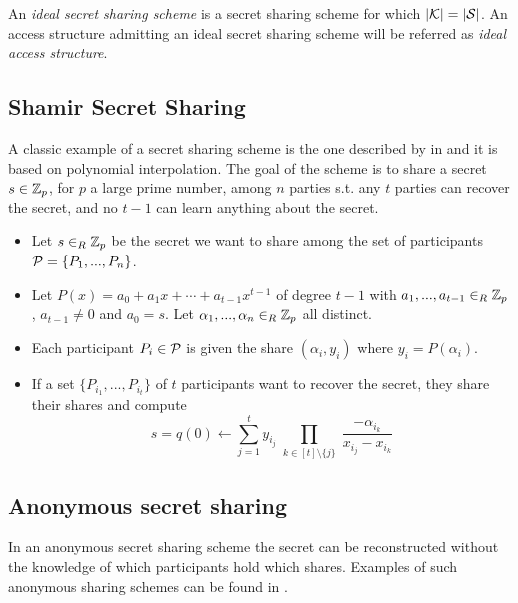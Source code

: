  An \textit{ideal secret sharing scheme} is a secret sharing scheme for which $\vert \mathcal{K} \vert = \vert \mathcal{S} \vert$. An access structure admitting an ideal secret sharing scheme will be referred as \textit{ideal access structure}.


\subsection{Shamir Secret Sharing}
A classic example of a secret sharing scheme is the one described by \citeauthor{Sham79} in \cite{Sham79} and it is based on polynomial interpolation. The goal of the scheme is to share a secret $s \in {\mathbb Z}_p$, for $p$ a large prime number, among $n$ parties s.t. any $t$ parties can recover the secret, and no $t-1$ can learn anything about the secret.

\begin{itemize}[align = left, leftmargin=*, label={--}]
\item Let $s \in_R {\mathbb Z}_p$ be the secret we want to share among the set of participants ${\mathcal P} = \{P_1, ... , P_n \}$.
\item Let $P(x) = a_0 + a_1 x + \cdots + a_{t-1} x^{t-1}$ of degree $t-1$ with $a_1, ..., a_{t-1} \in_R {\mathbb Z}_p$, $a_{t-1} \neq 0$ and $a_0 = s$. Let $\alpha_1, ... , \alpha_n \in_R {\mathbb Z}_p$ all distinct.
\item Each participant $P_i \in {\mathcal P}$ is given the share $(\alpha_i, y_i)$ where $y_i = P(\alpha_i)$.
\item If a set $\{P_{i_1},...,P_{i_t}\}$ of $t$ participants want to recover the secret, they share their shares and compute
$$ s = q(0) \leftarrow \sum_{j=1}^t y_{i_j} \prod_{\substack{k \in [t] \setminus \{j\}}} \frac{-\alpha_{i_k}}{x_{i_j}-x_{i_k}}$$
\end{itemize}

\subsection{Anonymous secret sharing}
In an anonymous secret sharing scheme the secret can be reconstructed without the knowledge of which participants hold which shares. Examples of such anonymous sharing schemes can be found in \cite{BlSt97}.

